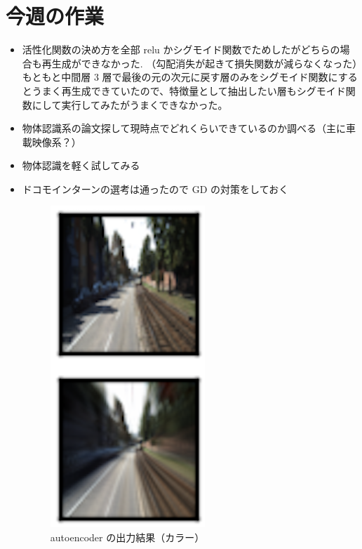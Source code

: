 \section{今週の作業}
\begin{itemize}
	\item 活性化関数の決め方を全部 relu かシグモイド関数でためしたがどちらの場合も再生成ができなかった. （勾配消失が起きて損失関数が減らなくなった）もともと中間層 3 層で最後の元の次元に戻す層のみをシグモイド関数にするとうまく再生成できていたので、特徴量として抽出したい層もシグモイド関数にして実行してみたがうまくできなかった。
         \item 物体認識系の論文探して現時点でどれくらいできているのか調べる（主に車載映像系？）
         \item 物体認識を軽く試してみる
         \item ドコモインターンの選考は通ったので GD の対策をしておく
\begin{figure}[hb]
\begin{center}
\includegraphics[scale=1.0]{autoencoder_2.png}
\caption{autoencoder の出力結果（カラー）}
\end{center}
\end{figure}
\end{itemize}







